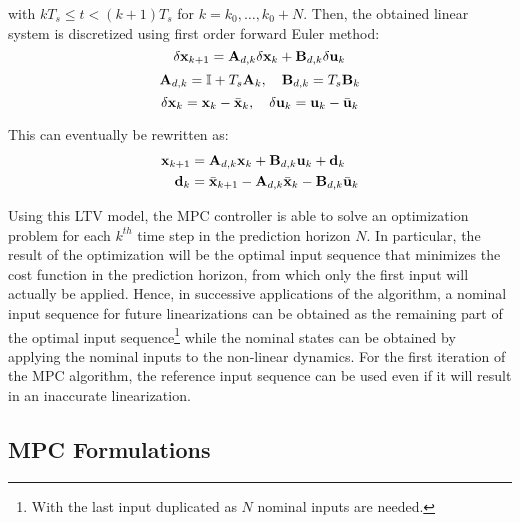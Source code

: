 \documentclass[../main.tex]{subfiles}
\begin{document}
with $k T_s \leq t < (k + 1) T_s$ for $k = k_0, \ldots, k_0 + N$. Then, the obtained
linear system is discretized using first order forward Euler method:
\begin{equation*}
	\delta \mathbf{x}_{k+1} = \mathbf{A}_{d,k} \delta \mathbf{x}_k + \mathbf{B}_{d,k} \delta
	\mathbf{u}_k
\end{equation*}
\begin{equation}\label{eq:discretization}
	\mathbf{A}_{d,k} = \mathbb{I} + T_s \mathbf{A}_k, \quad \mathbf{B}_{d,k} = T_s
	\mathbf{B}_k
\end{equation}
\begin{equation*}
	\delta \mathbf{x}_k = \mathbf{x}_k - \bar{\mathbf{x}}_k, \quad
	\delta \mathbf{u}_k = \mathbf{u}_k - \bar{\mathbf{u}}_k
\end{equation*}

This can eventually be rewritten as:
\begin{equation}
	\begin{aligned}
		\mathbf{x}_{k+1} &= \mathbf{A}_{d,k} \mathbf{x}_k + \mathbf{B}_{d,k} \mathbf{u}_k +
		\mathbf{d}_k\\
		\mathbf{d}_k &= \bar{\mathbf{x}}_{k+1} - \mathbf{A}_{d,k} \bar{\mathbf{x}}_k -
		\mathbf{B}_{d,k} \bar{\mathbf{u}}_k
	\end{aligned}
\end{equation}

Using this LTV model, the MPC controller is able to solve an optimization
problem for each $k^{th}$ time step in the prediction horizon $N$. In particular, the
result of the optimization will be the optimal input sequence that minimizes the
cost function in the prediction horizon, from which only the first input will
actually be applied. Hence, in successive applications of the algorithm, a
nominal input sequence for future linearizations can be obtained as the
remaining part of the optimal input sequence\footnote{With the last input
duplicated as $N$ nominal inputs are needed.} while the nominal states can be
obtained by applying the nominal inputs to the non-linear dynamics. For the
first iteration of the MPC algorithm, the reference input sequence can be used
even if it will result in an inaccurate linearization.

\subsection{MPC Formulations}
\end{document}
